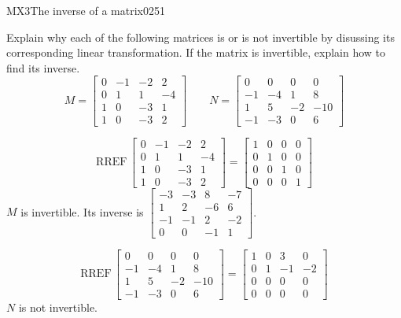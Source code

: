 \newpage




\begin{exercise}{MX3}{The inverse of a matrix}{0251} 
\begin{exerciseStatement} 

 Explain why each of the following matrices is or is not invertible by disussing its corresponding linear transformation. If the matrix is invertible, explain how to find its inverse. \[
\hspace{2em}
M = \left[\begin{array}{cccc}
0 & -1 & -2 & 2 \\
0 & 1 & 1 & -4 \\
1 & 0 & -3 & 1 \\
1 & 0 & -3 & 2
\end{array}\right]
\hspace{2em}
N = \left[\begin{array}{cccc}
0 & 0 & 0 & 0 \\
-1 & -4 & 1 & 8 \\
1 & 5 & -2 & -10 \\
-1 & -3 & 0 & 6
\end{array}\right]
\hspace{2em}
        \] 

 \end{exerciseStatement}
 \begin{exerciseAnswer} 

 \[\mathrm{RREF}\,\left[\begin{array}{cccc}
0 & -1 & -2 & 2 \\
0 & 1 & 1 & -4 \\
1 & 0 & -3 & 1 \\
1 & 0 & -3 & 2
\end{array}\right]=\left[\begin{array}{cccc}
1 & 0 & 0 & 0 \\
0 & 1 & 0 & 0 \\
0 & 0 & 1 & 0 \\
0 & 0 & 0 & 1
\end{array}\right]\] \(M\) is invertible. Its inverse is \(\left[\begin{array}{cccc}
-3 & -3 & 8 & -7 \\
1 & 2 & -6 & 6 \\
-1 & -1 & 2 & -2 \\
0 & 0 & -1 & 1
\end{array}\right]\). 

 

 \[\mathrm{RREF}\,\left[\begin{array}{cccc}
0 & 0 & 0 & 0 \\
-1 & -4 & 1 & 8 \\
1 & 5 & -2 & -10 \\
-1 & -3 & 0 & 6
\end{array}\right]=\left[\begin{array}{cccc}
1 & 0 & 3 & 0 \\
0 & 1 & -1 & -2 \\
0 & 0 & 0 & 0 \\
0 & 0 & 0 & 0
\end{array}\right]\] \(N\) is not invertible. 


\end{exerciseAnswer}
\end{exercise}
